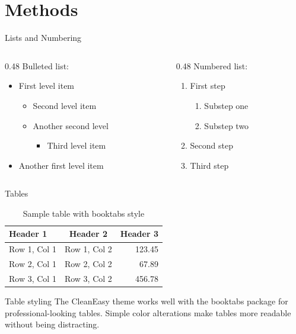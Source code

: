 \section{Methods}
\begin{frame}{Lists and Numbering}
  \begin{columns}
    \begin{column}{0.48\textwidth}
      Bulleted list:
      \begin{itemize}
        \item First level item
        \begin{itemize}
          \item Second level item
          \item Another second level
          \begin{itemize}
            \item Third level item
          \end{itemize}
        \end{itemize}
        \item Another first level item
      \end{itemize}
    \end{column}
    \begin{column}{0.48\textwidth}
      Numbered list:
      \begin{enumerate}
        \item First step
        \begin{enumerate}
          \item Substep one
          \item Substep two
        \end{enumerate}
        \item Second step
        \item Third step
      \end{enumerate}
    \end{column}
  \end{columns}
\end{frame}

\begin{frame}{Tables}
  \begin{table}
    \centering
    \caption{Sample table with booktabs style}
    \begin{tabular}{lcr}
      \toprule
      \textbf{Header 1} & \textbf{Header 2} & \textbf{Header 3} \\
      \midrule
      Row 1, Col 1 & Row 1, Col 2 & 123.45 \\
      Row 2, Col 1 & Row 2, Col 2 & 67.89 \\
      Row 3, Col 1 & Row 3, Col 2 & 456.78 \\
      \bottomrule
    \end{tabular}
  \end{table}
  
  \begin{block}{Table styling}
    The CleanEasy theme works well with the booktabs package for professional-looking tables. 
    Simple color alterations make tables more readable without being distracting.
  \end{block}
\end{frame}

